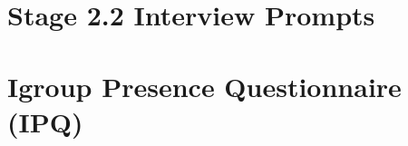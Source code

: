 \documentclass[a4paper]{report}
\begin{document}
\begin{appendices}
\chapter{Stage 2.2 Interview Prompts}

\label{appendix-interview-questions-stage-2-2}

\chapter{Igroup Presence Questionnaire (IPQ)}

\label{appendix-igroup-presence-questionnaire}

\end{appendices}





\end{document}
